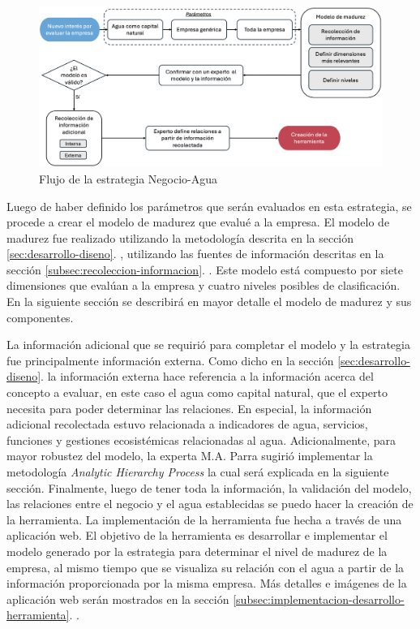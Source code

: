 \begin{figure}[H]
    \centering
    \includegraphics[scale=0.25]{images/5-implementacion/estrategia-negocio-agua.png}
    \caption{Flujo de la estrategia Negocio-Agua}
    \label{fig:estrategia-negocio-agua}
\end{figure}

Luego de haber definido los parámetros que serán evaluados en esta estrategia, se procede a crear el modelo de madurez que evalué a la empresa. El modelo de madurez fue realizado utilizando la metodología descrita en la sección \ref{sec:desarrollo-diseno}.  , utilizando las fuentes de información descritas en la sección \ref{subsec:recoleccion-informacion}. . Este modelo está compuesto por siete dimensiones que evalúan a la empresa y cuatro niveles posibles de clasificación.  En la siguiente sección se describirá en mayor detalle el modelo de madurez y sus componentes.

La información adicional que se requirió para completar el modelo y la estrategia fue principalmente información externa. Como dicho en la sección \ref{sec:desarrollo-diseno}.   la información externa hace referencia a la información acerca del concepto a evaluar, en este caso el agua como capital natural, que el experto necesita para poder determinar las relaciones. En especial, la información adicional recolectada estuvo relacionada a indicadores de agua, servicios, funciones y gestiones ecosistémicas relacionadas al agua. Adicionalmente, para mayor robustez del modelo, la experta M.A. Parra sugirió implementar la metodología \textit{Analytic Hierarchy Process} la cual será explicada en la siguiente sección. Finalmente, luego de tener toda la información, la validación del modelo, las relaciones entre el negocio y el agua establecidas se puedo hacer la creación de la herramienta. La implementación de la herramienta fue hecha a través de una aplicación web. El objetivo de la herramienta es desarrollar e implementar el modelo generado por la estrategia para determinar el nivel de madurez de la empresa, al mismo tiempo que se visualiza su relación con el agua a partir de la información proporcionada por la misma empresa. Más detalles e imágenes de la aplicación web serán mostrados en la sección \ref{subsec:implementacion-desarrollo-herramienta}. .

